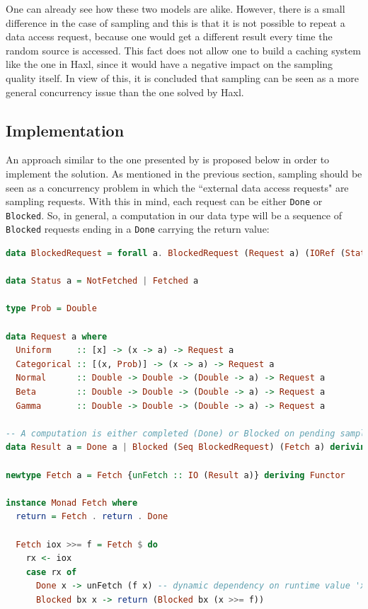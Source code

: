 \documentclass[
  oneside,
  11pt, a4paper,
  footinclude=true,
  headinclude=true,
  cleardoublepage=empty
]{scrbook}
\theoremstyle{definition}
\theoremstyle{definition}
\begin{document}
    One can already see how these two models are alike. However, there is a small difference in the case of sampling and this is that it is not possible to repeat a data access request, because one would get a different result every time the random source is accessed. This fact does not allow one to build a caching system like the one in Haxl, since it would have a negative impact on the sampling quality itself. In view of this, it is concluded that sampling can be seen as a more general concurrency issue than the one solved by Haxl.
    
    \subsection{Implementation}
    
    An approach similar to the one presented by \cite{Marlow:2014:NFA:2692915.2628144} is proposed below in order to implement the solution. As mentioned in the previous section, sampling should be seen as a concurrency problem in which the ``external data access requests" are sampling requests. With this in mind, each request can be either \texttt{Done} or \texttt{Blocked}. So, in general, a computation in our data type will be a sequence of \texttt{Blocked} requests ending in a \texttt{Done} carrying the return value:
    
    \begin{lstlisting}[language=Haskell, caption={Fetch Data Type},captionpos=b]
data BlockedRequest = forall a. BlockedRequest (Request a) (IORef (Status a))

data Status a = NotFetched | Fetched a

type Prob = Double

data Request a where
  Uniform     :: [x] -> (x -> a) -> Request a
  Categorical :: [(x, Prob)] -> (x -> a) -> Request a
  Normal      :: Double -> Double -> (Double -> a) -> Request a
  Beta        :: Double -> Double -> (Double -> a) -> Request a
  Gamma       :: Double -> Double -> (Double -> a) -> Request a

-- A computation is either completed (Done) or Blocked on pending sample requests
data Result a = Done a | Blocked (Seq BlockedRequest) (Fetch a) deriving Functor

newtype Fetch a = Fetch {unFetch :: IO (Result a)} deriving Functor

instance Monad Fetch where
  return = Fetch . return . Done

  Fetch iox >>= f = Fetch $ do
    rx <- iox
    case rx of
      Done x -> unFetch (f x) -- dynamic dependency on runtime value 'x'
      Blocked bx x -> return (Blocked bx (x >>= f))

    \end{lstlisting}
    
\end{document}
